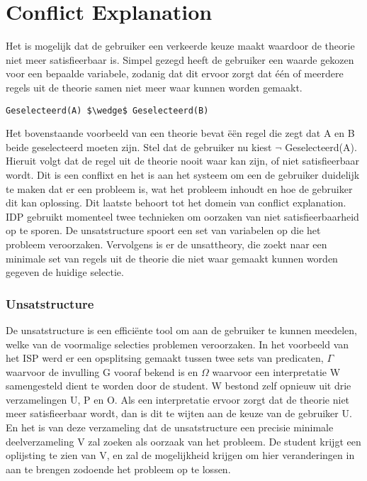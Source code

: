 \section{Conflict Explanation}
Het is mogelijk dat de gebruiker een verkeerde keuze maakt waardoor de theorie niet meer satisfieerbaar is. Simpel gezegd heeft de gebruiker een waarde gekozen voor een bepaalde variabele, zodanig dat dit ervoor zorgt dat \'{e}\'{e}n of meerdere regels uit de theorie samen niet meer waar kunnen worden gemaakt.

\begin{lstlisting}[mathescape]
Geselecteerd(A) $\wedge$ Geselecteerd(B)
\end{lstlisting}

Het bovenstaande voorbeeld van een theorie bevat \"{e}\"{e}n regel die zegt dat A en B beide geselecteerd moeten zijn. Stel dat de gebruiker nu kiest $\neg$ Geselecteerd(A). Hieruit volgt dat de regel uit de theorie nooit waar kan zijn, of niet satisfieerbaar wordt. Dit is een conflixt en het is aan het systeem om een de gebruiker duidelijk te maken dat er een probleem is, wat het probleem inhoudt en hoe de gebruiker dit kan oplossing. Dit laatste behoort tot het domein van conflict explanation. IDP gebruikt momenteel twee technieken om oorzaken van niet satisfieerbaarheid op te sporen. De unsatstructure spoort een set van variabelen op die het probleem veroorzaken. Vervolgens is er de unsattheory, die zoekt naar een minimale set van regels uit de theorie die niet waar gemaakt kunnen worden gegeven de huidige selectie.

\subsubsection{Unsatstructure}
De unsatstructure is een effici\"{e}nte tool om aan de gebruiker te kunnen meedelen, welke van de voormalige selecties problemen veroorzaken. In het voorbeeld van het ISP werd er een opsplitsing gemaakt tussen twee sets van predicaten, $\Gamma$ waarvoor de invulling G vooraf bekend is en $\Omega$ waarvoor een interpretatie W samengesteld dient te worden door de student. W bestond zelf opnieuw uit drie verzamelingen U, P en O. Als een interpretatie ervoor zorgt dat de theorie niet meer satisfieerbaar wordt, dan is dit te wijten aan de keuze van de gebruiker U. En het is van deze verzameling dat de unsatstructure een precisie minimale deelverzameling V zal zoeken als oorzaak van het probleem. De student krijgt een oplijsting te zien van V, en zal de mogelijkheid krijgen om hier veranderingen in aan te brengen zodoende het probleem op te lossen.

